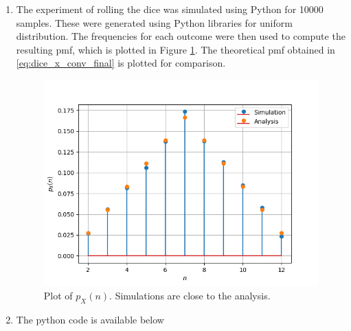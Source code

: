 \documentclass[journal,12pt,twocolumn]{IEEEtran}
\renewcommand\thesection{\arabic{section}}
\begin{document}
\begin{enumerate}[label=\thesection.\arabic*.,ref=\thesection.\theenumi]
where 
\begin{align}
u(n) =
\begin{cases}
1 & n \ge 0
\\
0 & n < 0
\end{cases}
\end{align}

From \eqref{eq:dice_xz}, \eqref{eq:dice_xzprod} and \eqref{eq:dice_xz_closed}
\begin{multline}
p_{X}(n) = \frac{1}{36}\lsbrak{\brak{n-1}u(n-1) 
}
\\
\rsbrak{- 2 \brak{n-7}u(n-7)+\brak{n-13}u(n-13)}
\end{multline}
which is the same as \eqref{eq:dice_x_conv_final}.  Note that  \eqref{eq:dice_x_conv_final} can be obtained from \eqref{eq:dice_xz_closed} using contour integration as well.

\item 
The experiment of rolling the dice was simulated using Python for 10000 samples.  These were generated using Python libraries for uniform distribution. The frequencies for each outcome were then used to compute the resulting pmf, which  is plotted in Figure \ref{fig:dice}.  The theoretical pmf obtained in \eqref{eq:dice_x_conv_final} is plotted for comparison.  
%
\begin{figure}[!ht]
\centering
\includegraphics[width=\columnwidth]{./figs/sum/pmf.png}
\caption{Plot of $p_X(n)$.  Simulations are close to the analysis. }
\label{fig:dice}
\end{figure}
\item The python code is available below
	

\end{enumerate}
\end{document}
